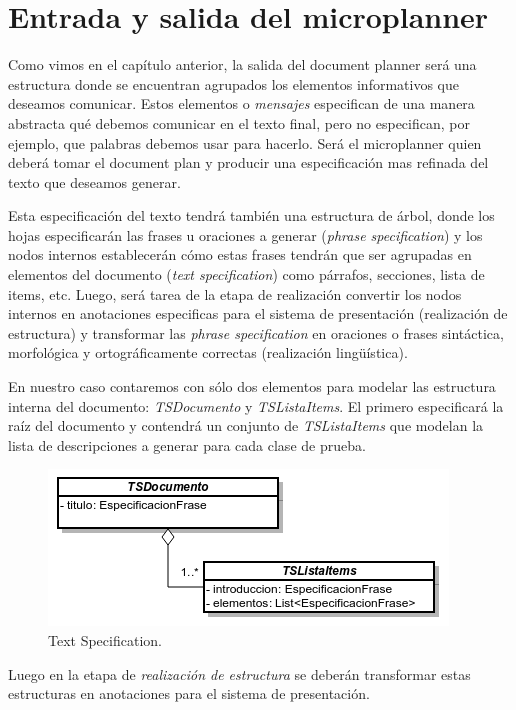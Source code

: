 \section{Entrada y salida del microplanner}

Como vimos en el capítulo anterior, la salida del document planner será una estructura donde se encuentran agrupados los elementos informativos que deseamos comunicar. Estos elementos o \emph{mensajes} especifican de una manera abstracta qué debemos comunicar en el texto final, pero no especifican, por ejemplo, que palabras debemos usar para hacerlo. Será el microplanner quien deberá tomar el document plan y producir una especificación mas refinada del texto que deseamos generar.

Esta especificación del texto tendrá también una estructura de árbol, donde los hojas especificarán las frases u oraciones a generar (\emph{phrase specification}) y los nodos internos establecerán cómo estas frases tendrán que ser agrupadas en elementos del documento (\emph{text specification}) como párrafos, secciones, lista de items, etc. Luego, será tarea de la etapa de realización convertir los nodos internos en anotaciones especificas para el sistema de presentación (realización de estructura) y transformar las \emph{phrase specification} en oraciones o frases sintáctica, morfológica y ortográficamente correctas (realización lingüística).

En nuestro caso contaremos con sólo dos elementos para modelar las estructura interna del documento: \emph{TSDocumento} y \emph{TSListaItems}. El primero especificará la raíz del documento y contendrá un conjunto de \emph{TSListaItems} que modelan la lista de descripciones a generar para cada clase de prueba. 

\begin{figure}[H]
  	\centering
	\includegraphics[scale=0.7]{img/text_spec.png}
	\caption{Text Specification.}
  	\label{fig:text_spec}
\end{figure}

Luego en la etapa de \emph{realización de estructura} se deberán transformar estas estructuras en anotaciones para el sistema de presentación.

